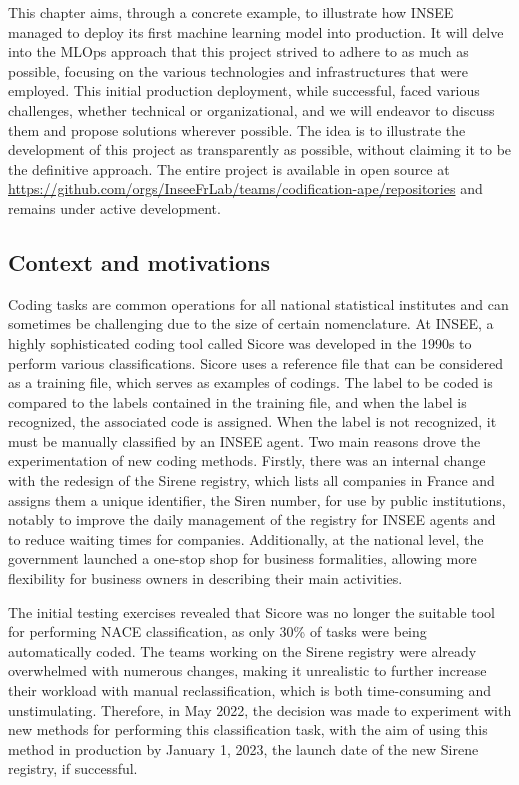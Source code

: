 This chapter aims, through a concrete example, to illustrate how INSEE managed to deploy its first machine learning model into production. It will delve into the MLOps approach that this project strived to adhere to as much as possible, focusing on the various technologies and infrastructures that were employed. This initial production deployment, while successful, faced various challenges, whether technical or organizational, and we will endeavor to discuss them and propose solutions wherever possible. The idea is to illustrate the development of this project as transparently as possible, without claiming it to be the definitive approach. The entire project is available in open source at \url{https://github.com/orgs/InseeFrLab/teams/codification-ape/repositories} and remains under active development.

\subsection{Context and motivations}

Coding tasks are common operations for all national statistical institutes and can sometimes be challenging due to the size of certain nomenclature. At INSEE, a highly sophisticated coding tool called Sicore was developed in the 1990s to perform various classifications. Sicore uses a reference file that can be considered as a training file, which serves as examples of codings. The label to be coded is compared to the labels contained in the training file, and when the label is recognized, the associated code is assigned. When the label is not recognized, it must be manually classified by an INSEE agent. Two main reasons drove the experimentation of new coding methods. Firstly, there was an internal change with the redesign of the Sirene registry, which lists all companies in France and assigns them a unique identifier, the Siren number, for use by public institutions, notably to improve the daily management of the registry for INSEE agents and to reduce waiting times for companies. Additionally, at the national level, the government launched a one-stop shop for business formalities, allowing more flexibility for business owners in describing their main activities.

The initial testing exercises revealed that Sicore was no longer the suitable tool for performing NACE classification, as only 30\% of tasks were being automatically coded. The teams working on the Sirene registry were already overwhelmed with numerous changes, making it unrealistic to further increase their workload with manual reclassification, which is both time-consuming and unstimulating. Therefore, in May 2022, the decision was made to experiment with new methods for performing this classification task, with the aim of using this method in production by January 1, 2023, the launch date of the new Sirene registry, if successful.

